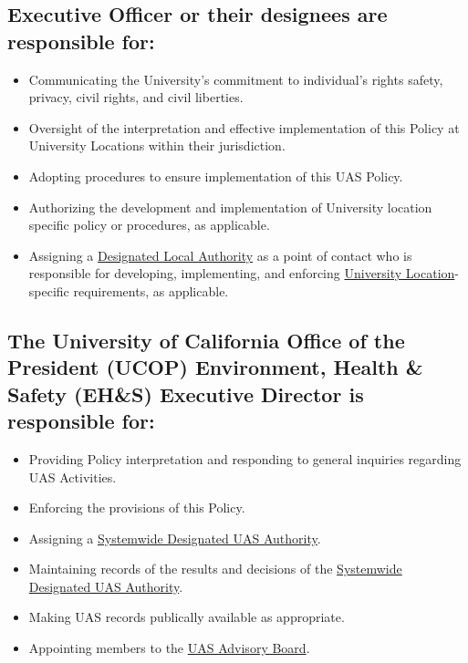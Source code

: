 \documentclass[
]{book}
\providecommand{\tightlist}{%
  \setlength{\itemsep}{0pt}\setlength{\parskip}{0pt}}
\begin{document}
\hypertarget{executive-officer-or-their-designees-are-responsible-for}{%
\subsection{Executive Officer or their designees are responsible for:}\label{executive-officer-or-their-designees-are-responsible-for}}

\begin{itemize}
\tightlist
\item
  Communicating the University's commitment to individual's rights safety, privacy, civil rights, and civil liberties.
\item
  Oversight of the interpretation and effective implementation of this Policy at University Locations within their jurisdiction.
\item
  Adopting procedures to ensure implementation of this UAS Policy.
\item
  Authorizing the development and implementation of University location specific policy or procedures, as applicable.
\item
  Assigning a \protect\hyperlink{DLA}{Designated Local Authority} as a point of contact who is responsible for developing, implementing, and enforcing \protect\hyperlink{UL}{University Location}-specific requirements, as applicable.
\end{itemize}

\hypertarget{the-university-of-california-office-of-the-president-ucop-environment-health-safety-ehs-executive-director-is-responsible-for}{%
\subsection{The University of California Office of the President (UCOP) Environment, Health \& Safety (EH\&S) Executive Director is responsible for:}\label{the-university-of-california-office-of-the-president-ucop-environment-health-safety-ehs-executive-director-is-responsible-for}}

\begin{itemize}
\tightlist
\item
  Providing Policy interpretation and responding to general inquiries regarding UAS Activities.
\item
  Enforcing the provisions of this Policy.
\item
  Assigning a \protect\hyperlink{SDA}{Systemwide Designated UAS Authority}.
\item
  Maintaining records of the results and decisions of the \protect\hyperlink{SDA}{Systemwide Designated UAS Authority}.
\item
  Making UAS records publically available as appropriate.
\item
  Appointing members to the \protect\hyperlink{AB}{UAS Advisory Board}.
\end{itemize}
\end{document}
